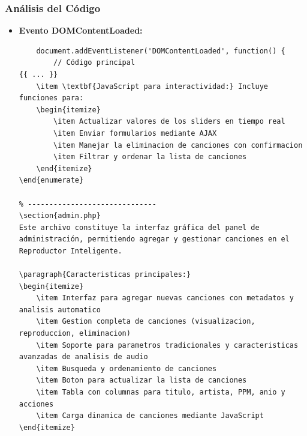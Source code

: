 \documentclass[a4paper,12pt]{article}
\begin{document}
\subsubsection{An\'alisis del C\'odigo}
\begin{itemize}
    \item \textbf{Evento DOMContentLoaded:}
    \begin{verbatim}
    document.addEventListener('DOMContentLoaded', function() {
        // Código principal
{{ ... }}
    \item \textbf{JavaScript para interactividad:} Incluye funciones para:
    \begin{itemize}
        \item Actualizar valores de los sliders en tiempo real
        \item Enviar formularios mediante AJAX
        \item Manejar la eliminacion de canciones con confirmacion
        \item Filtrar y ordenar la lista de canciones
    \end{itemize}
\end{enumerate}

% ------------------------------
\section{admin.php}
Este archivo constituye la interfaz gráfica del panel de administración, permitiendo agregar y gestionar canciones en el Reproductor Inteligente.

\paragraph{Caracteristicas principales:}
\begin{itemize}
    \item Interfaz para agregar nuevas canciones con metadatos y analisis automatico
    \item Gestion completa de canciones (visualizacion, reproduccion, eliminacion)
    \item Soporte para parametros tradicionales y caracteristicas avanzadas de analisis de audio
    \item Busqueda y ordenamiento de canciones
    \item Boton para actualizar la lista de canciones
    \item Tabla con columnas para titulo, artista, PPM, anio y acciones
    \item Carga dinamica de canciones mediante JavaScript
\end{itemize}


\end{verbatim}
\end{itemize}
\end{document}
